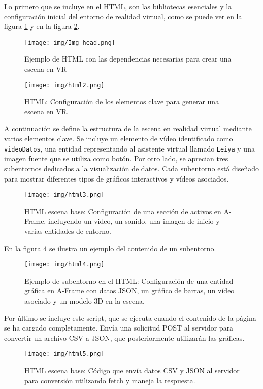 \documentclass[a4paper, 12pt]{book}
\begin{document}
 Lo primero que se incluye en el HTML, son las bibliotecas esenciales y la configuración inicial del entorno de realidad virtual, como se puede ver en la figura \ref{fig:head} y en la figura \ref{fig:html2}.
\begin{figure}[H]
\centering
\texttt{[image: img/Img\_head.png]}
\caption{Ejemplo de HTML con las dependencias necesarias para crear una escena en VR}
  \label{fig:head}
\end{figure}

\begin{figure}[H]
    \centering
    \texttt{[image: img/html2.png]}
    \caption{HTML: Configuración de los elementos clave para generar una escena en VR.}
    \label{fig:html2}
\end{figure}

A continuación se define la estructura de la escena en realidad virtual mediante varios elementos clave. Se incluye un elemento de vídeo identificado como \texttt{videoDatos}, una entidad representando al asistente virtual llamado \texttt{Leiya} y una imagen fuente que se utiliza como botón. Por otro lado, se aprecian tres subentornos dedicados a la visualización de datos. Cada subentorno está diseñado para mostrar diferentes tipos de gráficos interactivos y vídeos asociados.

\begin{figure}[H]
    \centering
    \texttt{[image: img/html3.png]}
    \caption{HTML escena base: Configuración de una sección de activos en A-Frame, incluyendo un video, un sonido, una imagen de inicio y varias entidades de entorno.
}
    \label{fig:html3l}
\end{figure}
\newpage
En la figura \ref{fig:html4} se ilustra un ejemplo del contenido de un subentorno.

\begin{figure}[H]
    \centering
    \texttt{[image: img/html4.png]}
    \caption{Ejemplo de subentorno en el HTML: Configuración de una entidad gráfica en A-Frame con datos JSON, un gráfico de barras, un vídeo asociado y un modelo 3D en la escena.
}
    \label{fig:html4}
\end{figure}

Por último se incluye este script, que se ejecuta cuando el contenido de la página se ha cargado completamente. Envía una solicitud POST al servidor para convertir un archivo CSV a JSON, que posteriormente utilizarán las gráficas.

\begin{figure}[H]
    \centering
    \texttt{[image: img/html5.png]}
    \caption{HTML escena base: Código que envía datos CSV y JSON al servidor para conversión utilizando fetch y maneja la respuesta.
}
    \label{fig:html5}
\end{figure}
\end{document}

